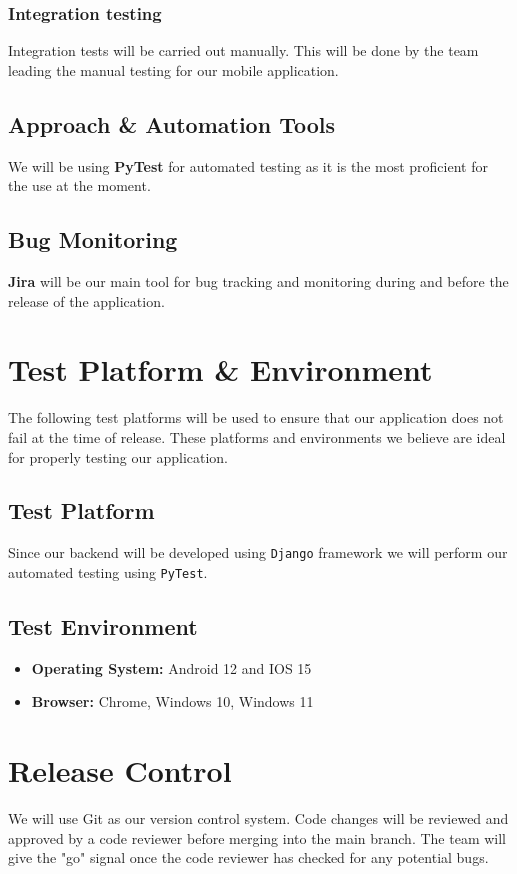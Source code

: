 \documentclass[title page]{article}
\begin{document}
\subsubsection{Integration testing}
Integration tests will be carried out manually. This will be done by the team leading the manual testing for our mobile application. 

\subsection{Approach \& Automation Tools}
We will be using \textbf{PyTest} for automated testing as it is the most proficient for the use at the moment. 


\subsection{Bug Monitoring}
\textbf{Jira} will be our main tool for bug tracking and monitoring during and before the release of the application. 


\section{Test Platform \& Environment}
The following test platforms will be used to ensure that our application does not fail at the time of release. These platforms and environments we believe are ideal for properly testing our application. 

\subsection{Test Platform}
Since our backend will be developed using \texttt{Django} framework we will perform our automated testing using \texttt{PyTest}.

\subsection{Test Environment}
\begin{itemize}
    \item \textbf{Operating System:} Android 12 and IOS 15
    \item \textbf{Browser:} Chrome, Windows 10, Windows 11
\end{itemize}

\section{Release Control}
We will use Git as our version control system. Code changes will be reviewed and approved by a code reviewer before merging into the main branch. The team will give the "go" signal once the code reviewer has checked for any potential bugs. 
\end{document}
